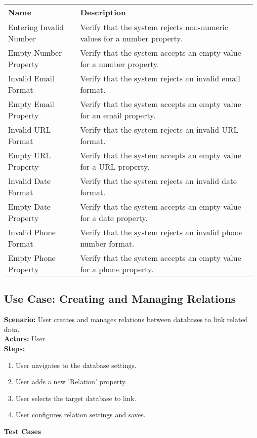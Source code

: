 \documentclass{article}
\begin{document}
            \begin{longtable}{|p{}|p{}|}
            \hline
            \textbf{Name} & \textbf{Description} \\
            \hline
            Entering Invalid Number & Verify that the system rejects non-numeric values for a number property. \\
\hline
Empty Number Property & Verify that the system accepts an empty value for a number property. \\
\hline
Invalid Email Format & Verify that the system rejects an invalid email format. \\
\hline
Empty Email Property & Verify that the system accepts an empty value for an email property. \\
\hline
Invalid URL Format & Verify that the system rejects an invalid URL format. \\
\hline
Empty URL Property & Verify that the system accepts an empty value for a URL property. \\
\hline
Invalid Date Format & Verify that the system rejects an invalid date format. \\
\hline
Empty Date Property & Verify that the system accepts an empty value for a date property. \\
\hline
Invalid Phone Format & Verify that the system rejects an invalid phone number format. \\
\hline
Empty Phone Property & Verify that the system accepts an empty value for a phone property. \\
\hline
\end{longtable}\subsection{\textbf{Use Case: Creating and Managing Relations}}
\textbf{Scenario:} User creates and manages relations between databases to link related data.\\
\textbf{Actors:} User\\
\textbf{Steps:}
\begin{enumerate}
\item User navigates to the database settings.
\item User adds a new 'Relation' property.
\item User selects the target database to link.
\item User configures relation settings and saves.
\end{enumerate}
\textbf{Test Cases}
\end{document}
